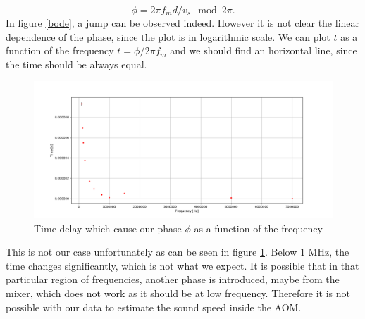 \documentclass[a4paper,10pt]{article}
\begin{document}
 \begin{equation}\phi = 2\pi f_m d/v_s \mod 2\pi.\end{equation}
In figure \ref{bode}, a jump can be observed indeed. However it is not clear the linear dependence of the phase, since the plot is in logarithmic scale. We can plot $t$ as a function of the frequency $t = \phi/2\pi f_m$ and we should find an horizontal line, since the time should be always equal. 
\begin{figure}[H]
\centering
\includegraphics[width=\textwidth]{time}
\caption{Time delay which cause our phase $\phi$ as a function of the frequency}\label{cazzo}
\end{figure}
This is not our case unfortunately as can be seen in figure \ref{cazzo}. Below 1 MHz, the time changes significantly, which is not what we expect. It is possible that in that particular region of frequencies, another phase is introduced, maybe from the mixer, which does not work as it should be at low frequency.  Therefore it is not possible with our data to estimate the sound speed inside the AOM.
\end{document}
